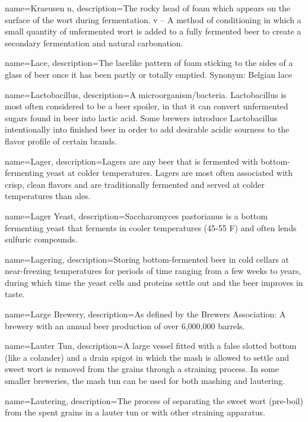 {
  name={Kraeusen n},
  description={The rocky head of foam which appears on the surface of the wort during fermentation. v – A method of conditioning in which a small quantity of unfermented wort is added to a fully fermented beer to create a secondary fermentation and natural carbonation.}
  }

{
  name={Lace},
  description={The lacelike pattern of foam sticking to the sides of a glass of beer once it has been partly or totally emptied. Synonym: Belgian lace}
  }

{
  name={Lactobacillus},
  description={A microorganism/bacteria. Lactobacillus is most often considered to be a beer spoiler, in that it can convert unfermented sugars found in beer into lactic acid. Some brewers introduce Lactobacillus intentionally into finished beer in order to add desirable acidic sourness to the flavor profile of certain brands.}
  }

{
  name={Lager},
  description={Lagers are any beer that is fermented with bottom-fermenting yeast at colder temperatures. Lagers are most often associated with crisp, clean flavors and are traditionally fermented and served at colder temperatures than ales.}
  }

{
  name={Lager Yeast},
  description={Saccharomyces pastorianus is a bottom fermenting yeast that ferments in cooler temperatures (45-55 F) and often lends sulfuric compounds.}
  }

{
  name={Lagering},
  description={Storing bottom-fermented beer in cold cellars at near-freezing temperatures for periods of time ranging from a few weeks to years, during which time the yeast cells and proteins settle out and the beer improves in taste.}
  }

{
  name={Large Brewery},
  description={As defined by the Brewers Association: A brewery with an annual beer production of over 6,000,000 barrels.}
  }

{
  name={Lauter Tun},
  description={A large vessel fitted with a false slotted bottom (like a colander) and a drain spigot in which the mash is allowed to settle and sweet wort is removed from the grains through a straining process. In some smaller breweries, the mash tun can be used for both mashing and lautering.}
  }

{
  name={Lautering},
  description={The process of separating the sweet wort (pre-boil) from the spent grains in a lauter tun or with other straining apparatus.}
  }

